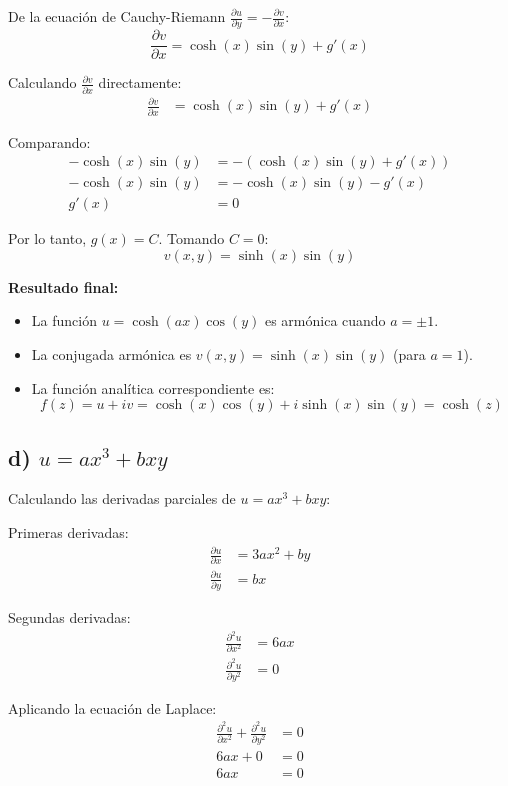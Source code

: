 \documentclass{article}
\begin{document}
De la ecuación de Cauchy-Riemann $\frac{\partial u}{\partial y} = -\frac{\partial v}{\partial x}$:
$$\frac{\partial v}{\partial x} = \cosh(x)\sin(y) + g'(x)$$

Calculando $\frac{\partial v}{\partial x}$ directamente:
\begin{align*}
\frac{\partial v}{\partial x} &= \cosh(x)\sin(y) + g'(x)
\end{align*}

Comparando:
\begin{align*}
-\cosh(x)\sin(y) &= -(\cosh(x)\sin(y) + g'(x)) \\
-\cosh(x)\sin(y) &= -\cosh(x)\sin(y) - g'(x) \\
g'(x) &= 0
\end{align*}

Por lo tanto, $g(x) = C$. Tomando $C = 0$:
$$v(x,y) = \sinh(x)\sin(y)$$

\textbf{Resultado final:}
\begin{itemize}
\item La función $u = \cosh(ax)\cos(y)$ es armónica cuando $a = \pm 1$.
\item La conjugada armónica es $v(x,y) = \sinh(x)\sin(y)$ (para $a = 1$).
\item La función analítica correspondiente es:
$$f(z) = u + iv = \cosh(x)\cos(y) + i\sinh(x)\sin(y) = \cosh(z)$$
\end{itemize}

\subsection*{d) $u = ax^3 + bxy$}

Calculando las derivadas parciales de $u = ax^3 + bxy$:

Primeras derivadas:
\begin{align*}
\frac{\partial u}{\partial x} &= 3ax^2 + by \\
\frac{\partial u}{\partial y} &= bx
\end{align*}

Segundas derivadas:
\begin{align*}
\frac{\partial^2 u}{\partial x^2} &= 6ax \\
\frac{\partial^2 u}{\partial y^2} &= 0
\end{align*}

Aplicando la ecuación de Laplace:
\begin{align*}
\frac{\partial^2 u}{\partial x^2} + \frac{\partial^2 u}{\partial y^2} &= 0 \\
6ax + 0 &= 0 \\
6ax &= 0
\end{align*}
\end{document}
